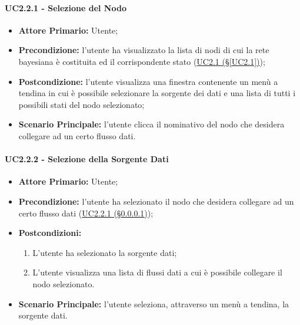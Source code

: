 \paragraph{UC2.2.1 - Selezione del Nodo}\label{UC2.2.1}
\begin{itemize}
\item \textbf{Attore Primario:} Utente;
\item \textbf{Precondizione:} l'utente ha visualizzato la lista di nodi di cui la rete bayesiana è costituita ed il 	corrispondente stato (\hyperref[UC2.1]{UC2.1 (§\ref*{UC2.1})});
\item \textbf{Postcondizione:} l'utente visualizza una finestra contenente un menù a tendina in cui è possibile selezionare la sorgente dei dati e una lista di tutti i possibili stati del nodo selezionato;
\item \textbf{Scenario Principale:} l'utente clicca il nominativo del nodo che desidera collegare ad un certo flusso dati.
\end{itemize}

\paragraph{UC2.2.2 - Selezione della Sorgente Dati}\label{UC2.2.2}
\begin{itemize}
\item \textbf{Attore Primario:} Utente;
\item \textbf{Precondizione:} l'utente ha selezionato il nodo che desidera collegare ad un certo flusso dati 					(\hyperref[UC2.2.1]{UC2.2.1 (§\ref*{UC2.2.1})});
\item \textbf{Postcondizioni:} 
	\begin{enumerate}
	\item L'utente ha selezionato la sorgente dati;
	\item L'utente visualizza una lista di flussi dati a cui è possibile 	collegare il nodo selezionato.
	\end{enumerate}
\item \textbf{Scenario Principale:} l'utente seleziona, attraverso un menù a tendina, la sorgente dati.
\end{itemize}

